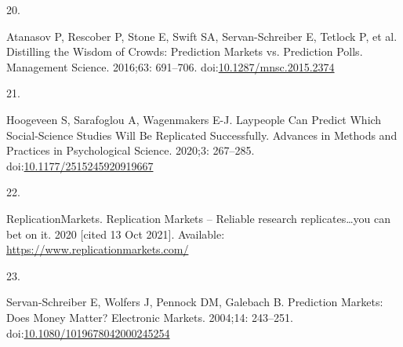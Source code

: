 \documentclass[10pt,letterpaper]{article} %
\newlength{\cslhangindent}
\newlength{\csllabelwidth}
\newlength{\cslentryspacingunit} %
\newenvironment{CSLReferences}[2] %
 {%
  \setlength{\parindent}{0pt}
  \ifodd #1
  \let\oldpar\par
  \def\par{\hangindent=\cslhangindent\oldpar}
  \fi
  \setlength{\parskip}{#2\cslentryspacingunit}
 }%
 {}
\newcommand{\CSLLeftMargin}[1]{\parbox[t]{\csllabelwidth}{#1}}
\newcommand{\CSLRightInline}[1]{\parbox[t]{\linewidth - \csllabelwidth}{#1}\break}
\providecommand{\DIFaddbegin}{} %
\providecommand{\DIFaddend}{} %
\providecommand{\DIFdelbegin}{} %
\providecommand{\DIFdelend}{} %
\newcommand{\DIFscaledelfig}{0.5}
\newlength{\DIFdelgraphicswidth} %
\newlength{\DIFdelgraphicsheight} %
\newcommand{\DIFaddincludegraphics}[2][]{{\color{blue}\fbox{\DIFOincludegraphics[#1]{#2}}}} %
\newcommand{\DIFdelincludegraphics}[2][]{%
\sbox{\DIFdelgraphicsbox}{\DIFOincludegraphics[#1]{#2}}%
\settoboxwidth{\DIFdelgraphicswidth}{\DIFdelgraphicsbox} %
\settoboxtotalheight{\DIFdelgraphicsheight}{\DIFdelgraphicsbox} %
\scalebox{\DIFscaledelfig}{%
\parbox[b]{\DIFdelgraphicswidth}{\usebox{\DIFdelgraphicsbox}\\[-\baselineskip] \rule{\DIFdelgraphicswidth}{0em}}\llap{\resizebox{\DIFdelgraphicswidth}{\DIFdelgraphicsheight}{%
\setlength{\unitlength}{\DIFdelgraphicswidth}%
\begin{picture}(1,1)%
\thicklines\linethickness{2pt} %
{\color[rgb]{1,0,0}\put(0,0){\framebox(1,1){}}}%
{\color[rgb]{1,0,0}\put(0,0){\line( 1,1){1}}}%
{\color[rgb]{1,0,0}\put(0,1){\line(1,-1){1}}}%
\end{picture}%
}\hspace*{3pt}}} %
} %
\DeclareRobustCommand{\DIFaddbegin}{\DIFOaddbegin \let\includegraphics\DIFaddincludegraphics} %
\DeclareRobustCommand{\DIFaddend}{\DIFOaddend \let\includegraphics\DIFOincludegraphics} %
\DeclareRobustCommand{\DIFdelbegin}{\DIFOdelbegin \let\includegraphics\DIFdelincludegraphics} %
\DeclareRobustCommand{\DIFdelend}{\DIFOaddend \let\includegraphics\DIFOincludegraphics} %
\begin{document}
\begin{CSLReferences}{0}{0}
\leavevmode{}%
\CSLLeftMargin{20. }
\DIFdelbegin %
\DIFdelend \DIFaddbegin \CSLRightInline{Atanasov P, Rescober P, Stone E, Swift SA,
Servan-Schreiber E, Tetlock P, et al. Distilling the {Wisdom} of
{Crowds}: {Prediction Markets} vs. {Prediction Polls}. Management
Science. 2016;63: 691--706.
doi:\href{https://doi.org/10.1287/mnsc.2015.2374}{10.1287/mnsc.2015.2374}}
\DIFaddend 

\leavevmode{}%
\CSLLeftMargin{21. }
\DIFdelbegin %
\DIFdelend \DIFaddbegin \CSLRightInline{Hoogeveen S, Sarafoglou A, Wagenmakers E-J. Laypeople
{Can Predict Which Social-Science Studies Will Be Replicated
Successfully}. Advances in Methods and Practices in Psychological
Science. 2020;3: 267--285.
doi:\href{https://doi.org/10.1177/2515245920919667}{10.1177/2515245920919667}}
\DIFaddend 

\leavevmode{}%
\CSLLeftMargin{22. }
\DIFdelbegin %
\DIFdelend \DIFaddbegin \CSLRightInline{ReplicationMarkets. Replication {Markets} -- {Reliable}
research replicates\ldots you can bet on it. 2020 {[}cited 13 Oct
2021{]}. Available: \url{https://www.replicationmarkets.com/}}
\DIFaddend 

\leavevmode{}%
\CSLLeftMargin{23. }
\DIFdelbegin %
\DIFdelend \DIFaddbegin \CSLRightInline{Servan-Schreiber E, Wolfers J, Pennock DM, Galebach B.
Prediction {Markets}: {Does Money Matter}? Electronic Markets. 2004;14:
243--251.
doi:\href{https://doi.org/10.1080/1019678042000245254}{10.1080/1019678042000245254}}
\DIFaddend 


\end{CSLReferences}
\end{document}
